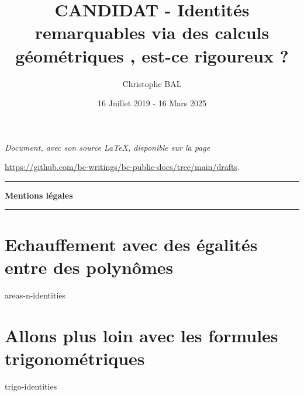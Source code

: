\documentclass[12pt]{amsart}
\begin{document}

\title{CANDIDAT - Identités remarquables via des calculs {\og géométriques \fg}, est-ce rigoureux ?}
\author{Christophe BAL}
\date{16 Juillet 2019 - 16 Mars 2025}

\maketitle

\begin{center}
	\itshape
	Document, avec son source \LaTeX, disponible sur la page

	\url{https://github.com/bc-writings/bc-public-docs/tree/main/drafts}.
\end{center}


\bigskip


\begin{center}
	\hrule\vspace{.3em}
	{
		\fontsize{1.35em}{1em}\selectfont
		\textbf{Mentions \og légales \fg}
	}

	\vspace{0.45em}
	\doclicenseThis
	\hrule
\end{center}


\bigskip


\setcounter{tocdepth}{1}
\tableofcontents



\newpage

\section{Echauffement avec des égalités entre des polynômes}

{areas-n-identities}



\newpage

\section{Allons plus loin avec les formules trigonométriques}

{trigo-identities}
\end{document}
